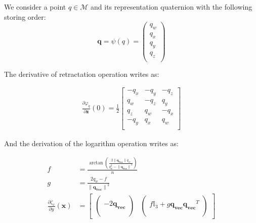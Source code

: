We consider a point $q\in\mathcal{M}$ and its representation quaternion with the following storing order:
\begin{equation}
\mathbf{q}=\psi(q)
= \begin{pmatrix}
  q_w \\
  q_x \\
  q_y \\
  q_z \\
\end{pmatrix}
\end{equation}

The derivative of retractation operation writes as:

\begin{align}
\label{eq:diffRetrSO3Quat}
  \frac{\partial \varphi_q}{\partial \mathbf{z}}(0) = \frac{1}{2}
  \begin{bmatrix}
    -q_x & -q_y & -q_z \\
     q_w & -q_z &  q_y \\
     q_z &  q_w & -q_x \\
    -q_y &  q_x &  q_w \\
  \end{bmatrix}
\end{align}

And the derivation of the logarithm operation writes as:

\begin{align}
\label{eq:diffLogSO3Quat}
  f &= \frac{\arctan \left( \frac{2 \|\mathbf{q_{vec}}\| q_w}{q_w^2 - {\|\mathbf{q_{vec}}\|}^2} \right)}{n}\\
  g &= \frac{2 q_w - f}{{\|\mathbf{q_{vec}}\|}^2} \\
  \frac{\partial \zeta_x}{\partial y}(\mathbf{x}) &= \begin{bmatrix}
  \begin{pmatrix}
    \\
    -2\mathbf{q_{vec}}\\
    \\
  \end{pmatrix} &
  \begin{pmatrix}
    \\
    f\mathbb{I}_3 + g\mathbf{q_{vec}}\mathbf{q_{vec}}^T\\
    \\
  \end{pmatrix}
  \end{bmatrix}
\end{align}


